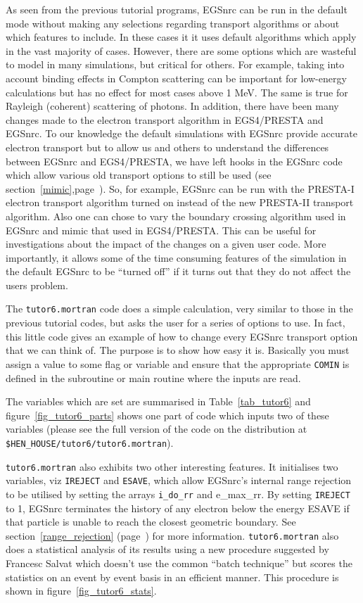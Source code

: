 As seen from the previous tutorial programs, EGSnrc can be run in the
default mode without making any selections regarding transport algorithms
or about which features to include. In these cases it it uses default
algorithms which apply in the vast majority of cases.  However, there are
some options which are wasteful to model in many simulations, but
critical for others.  For example, taking into account binding effects in
Compton scattering can be important for low-energy calculations but has no
effect for most cases above 1 MeV. The same is true for Rayleigh (coherent) 
scattering of photons. In addition, there have been many changes made to the
electron transport algorithm in EGS4/PRESTA and EGSnrc.  To our knowledge
the default simulations with EGSnrc provide accurate electron transport but
to allow us and others to understand the differences between EGSnrc and
EGS4/PRESTA, we have left hooks in the EGSnrc code which allow various
old transport options to still be used (see
section~\ref{mimic},page~\pageref{mimic}). So, for example, EGSnrc can be run
with the PRESTA-I electron transport algorithm turned on instead of the new
PRESTA-II transport algorithm.  Also one can chose to vary the boundary
crossing algorithm used in EGSnrc and mimic that used in EGS4/PRESTA.  This
can be useful for investigations about the impact of the changes on a given
user code.  More importantly, it allows some of the time consuming features
of the simulation in the default EGSnrc to be ``turned off'' if it turns
out that they do not affect the users problem.

The {\tt tutor6.mortran} code does a simple calculation, very similar to
those in the previous tutorial codes, but asks the user for a series of
options to use.  In fact, this little code gives an example of how to
change every EGSnrc transport option that we can think of.  The purpose is
to show how easy it is. Basically you must assign a value to some flag or
variable and
ensure that the appropriate {\tt COMIN} is defined in the subroutine or
main routine where the inputs are read.

The variables which are set are summarised in Table~\ref{tab_tutor6} and
figure~\ref{fig_tutor6_parts} shows one part of code which inputs two of
these variables (please see the full version of the code on the
distribution at {\tt \$HEN\_HOUSE/tutor6/tutor6.mortran}).

{\tt tutor6.mortran} also exhibits two other interesting features. It
initialises two variables, viz {\tt IREJECT} and {\tt ESAVE},  which
allow EGSnrc's internal range rejection to be utilised by setting the
arrays {\tt i\_do\_rr} and {e\_max\_rr}.  By setting {\tt IREJECT} to 1,
EGSnrc terminates the history of any electron below the energy ESAVE
if that particle is unable to reach the closest geometric boundary.
See section~\ref{range_rejection} (page~\pageref{range_rejection})
for more information.  {\tt tutor6.mortran} also does a statistical
analysis of its results using a new procedure suggested by Francesc
Salvat\cite{SB00} which doesn't use the common ``batch technique''
but scores the statistics on an event by event basis in an efficient
manner. This procedure is shown in figure~\ref{fig_tutor6_stats}.

